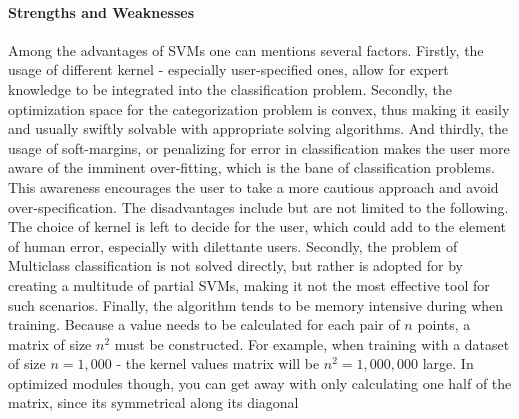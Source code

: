 \paragraph{Strengths and Weaknesses}
	Among the advantages of SVMs one can mentions several factors. Firstly, the usage of different kernel - especially user-specified ones, allow for expert knowledge to be integrated into the classification problem. Secondly, the optimization space for the categorization problem is convex, thus making it easily and usually swiftly solvable with appropriate solving algorithms. And thirdly, the usage of soft-margins, or penalizing for error in classification makes the user more aware of the imminent over-fitting, which is the bane of classification problems. This awareness encourages the user to take a more cautious approach and avoid over-specification. The disadvantages include but are not limited to the following. The choice of kernel is left to decide for the user, which could add to the element of human error, especially with dilettante users. Secondly, the problem of Multiclass classification is not solved directly, but rather is adopted for by creating a multitude of partial SVMs, making it not the most effective tool for such scenarios. Finally, the algorithm tends to be memory intensive during when training. Because a value needs to be calculated for each pair of $n$ points, a matrix of size $n^2$ must be constructed. For example, when training with a dataset of size $n = 1,000$ - the kernel values matrix will be $n^2 = 1,000,000$ large. In optimized modules though, you can get away with only calculating one half of the matrix, since its symmetrical along its diagonal 
